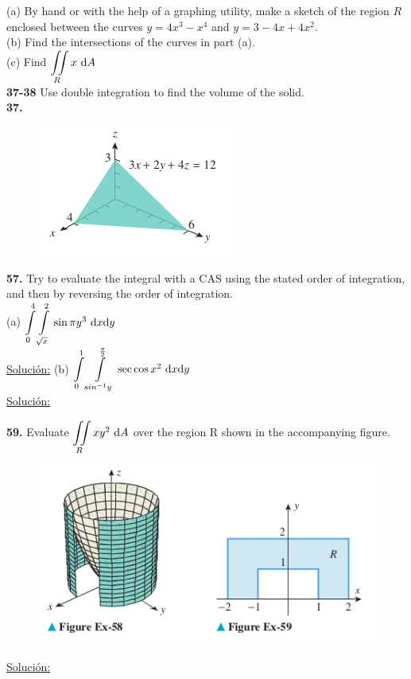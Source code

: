 \documentclass[11pt]{report}
\newcommand{\s}{\underline{Soluci\'{o}n:}}
\begin{document}
(a) By hand or with the help of a graphing utility, make a sketch of the region
$R$ enclosed between the curves $y = 4x^3 - x^4$ and $y = 3 - 4x + 4x^2$. \\

(b) Find the intersections of the curves in part (a). \\

(c) Find $ {\displaystyle \iint \limits_R } \, x \, \, \text dA $ \\

\textbf{37-38} Use double integration to find the volume of the solid. \\

\textbf{37.} \\

\begin{figure}[h]
\includegraphics[scale=0.5]{img1.png}
\centering
\end{figure}

\textbf{57.} Try to evaluate the integral with a CAS using the stated order of
integration, and then by reversing the order of integration.\\

(a) $ {\displaystyle \int \limits_0^4 \int \limits_{\sqrt{x}}^2 } \, \sin{\pi y^3} \, \, \text dx \text dy $ \\
\s
(b) $ {\displaystyle \int \limits_0^1 \int \limits_{sin^{-1}y}^{\frac{\pi}{2}} } \, \sec{\cos{x}}^2 \, \, \text dx \text dy $ \\
\s

\textbf{59.} Evaluate $ {\displaystyle \iint \limits_R } \, xy^2 \, \, \text dA $ over
the region R shown in the accompanying figure. \\
\begin{figure}[h]
\includegraphics[scale=0.5]{img2.png}
\centering
\end{figure}
\s
\end{document}
